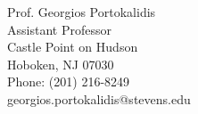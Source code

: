 \documentclass[10pt,a4]{article}
\begin{document}
\begin{small}
\begin{footnotesize}
\begin{multicols}{2}
\noindent
Prof. Georgios Portokalidis \\
Assistant Professor \\
Castle Point on Hudson \\
Hoboken, NJ 07030 \\
Phone: (201) 216-8249 \\
 georgios.portokalidis@stevens.edu \\
\end{multicols}

\end{footnotesize}
\end{small}
\end{document}
